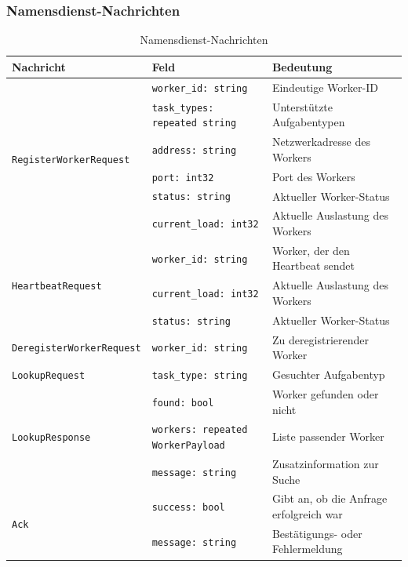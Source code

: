 \subsubsection*{Namensdienst-Nachrichten}
\begin{table}[H]
	\centering
	\begin{tabular}{m{4.75cm} m{4.5cm} m{6.5cm}}
		\toprule
		\textbf{Nachricht} & \textbf{Feld} & \textbf{Bedeutung} \\
		\midrule
		\multirow{6}{*}{\texttt{RegisterWorkerRequest}} 
		& \texttt{worker\_id: string} & Eindeutige Worker-ID \\
		& \texttt{task\_types: repeated string} & Unterstützte Aufgabentypen \\
		& \texttt{address: string} & Netzwerkadresse des Workers \\
		& \texttt{port: int32} & Port des Workers \\
		& \texttt{status: string} & Aktueller Worker-Status \\
		& \texttt{current\_load: int32} & Aktuelle Auslastung des Workers \\
		\midrule
		\multirow{3}{*}{\texttt{HeartbeatRequest}} 
		& \texttt{worker\_id: string} & Worker, der den Heartbeat sendet \\
		& \texttt{current\_load: int32} & Aktuelle Auslastung des Workers \\
		& \texttt{status: string} & Aktueller Worker-Status \\
		\midrule
		\multirow{1}{*}{\texttt{DeregisterWorkerRequest}} 
		& \texttt{worker\_id: string} & Zu deregistrierender Worker \\
		\midrule
		\multirow{1}{*}{\texttt{LookupRequest}} 
		& \texttt{task\_type: string} & Gesuchter Aufgabentyp \\
		\midrule
		\multirow{3}{*}{\texttt{LookupResponse}} 
		& \texttt{found: bool} & Worker gefunden oder nicht \\
		& \texttt{workers: repeated WorkerPayload} & Liste passender Worker \\
		& \texttt{message: string} & Zusatzinformation zur Suche \\
		\midrule
		\multirow{2}{*}{\texttt{Ack}} 
		& \texttt{success: bool} & Gibt an, ob die Anfrage erfolgreich war \\
		& \texttt{message: string} & Bestätigungs- oder Fehlermeldung \\
		\bottomrule
	\end{tabular}
	\caption{Namensdienst-Nachrichten}
\end{table}

